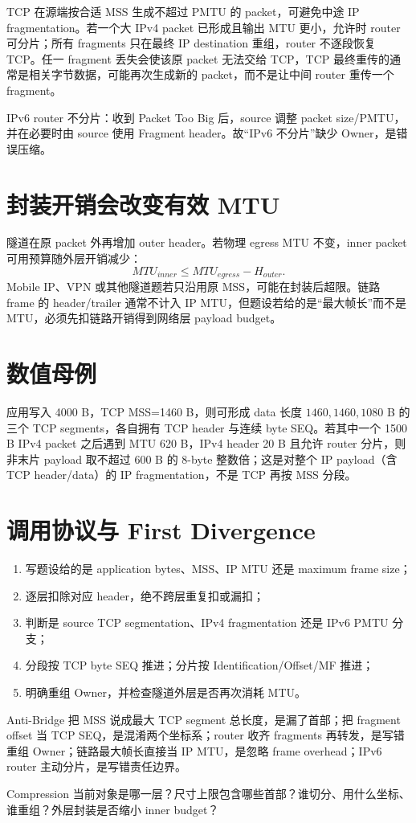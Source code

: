 \documentclass[UTF8,fontset=none,11pt,a4paper]{ctexart}
\begin{document}
TCP 在源端按合适 MSS 生成不超过 PMTU 的 packet，可避免中途 IP fragmentation。若一个大 IPv4 packet 已形成且输出 MTU 更小，允许时 router 可分片；所有 fragments 只在最终 IP destination 重组，router 不逐段恢复 TCP。任一 fragment 丢失会使该原 packet 无法交给 TCP，TCP 最终重传的通常是相关字节数据，可能再次生成新的 packet，而不是让中间 router 重传一个 fragment。

IPv6 router 不分片：收到 Packet Too Big 后，source 调整 packet size/PMTU，并在必要时由 source 使用 Fragment header。故“IPv6 不分片”缺少 Owner，是错误压缩。

\section{封装开销会改变有效 MTU}

隧道在原 packet 外再增加 outer header。若物理 egress MTU 不变，inner packet 可用预算随外层开销减少：
\[
MTU_{inner}\le MTU_{egress}-H_{outer}.
\]
Mobile IP、VPN 或其他隧道题若只沿用原 MSS，可能在封装后超限。链路 frame 的 header/trailer 通常不计入 IP MTU，但题设若给的是“最大帧长”而不是 MTU，必须先扣链路开销得到网络层 payload budget。

\section{数值母例}

应用写入 4000 B，TCP MSS=1460 B，则可形成 data 长度 $1460,1460,1080$ B 的三个 TCP segments，各自拥有 TCP header 与连续 byte SEQ。若其中一个 1500 B IPv4 packet 之后遇到 MTU 620 B，IPv4 header 20 B 且允许 router 分片，则非末片 payload 取不超过 600 B 的 8-byte 整数倍；这是对整个 IP payload（含 TCP header/data）的 IP fragmentation，不是 TCP 再按 MSS 分段。

\section{调用协议与 First Divergence}

\begin{enumerate}
\item 写题设给的是 application bytes、MSS、IP MTU 还是 maximum frame size；
\item 逐层扣除对应 header，绝不跨层重复扣或漏扣；
\item 判断是 source TCP segmentation、IPv4 fragmentation 还是 IPv6 PMTU 分支；
\item 分段按 TCP byte SEQ 推进；分片按 Identification/Offset/MF 推进；
\item 明确重组 Owner，并检查隧道外层是否再次消耗 MTU。
\end{enumerate}

\begin{warnbox}{Anti-Bridge}
把 MSS 说成最大 TCP segment 总长度，是漏了首部；把 fragment offset 当 TCP SEQ，是混淆两个坐标系；router 收齐 fragments 再转发，是写错重组 Owner；链路最大帧长直接当 IP MTU，是忽略 frame overhead；IPv6 router 主动分片，是写错责任边界。
\end{warnbox}

\begin{corebox}{Compression}
当前对象是哪一层？尺寸上限包含哪些首部？谁切分、用什么坐标、谁重组？外层封装是否缩小 inner budget？
\end{corebox}
\end{document}
